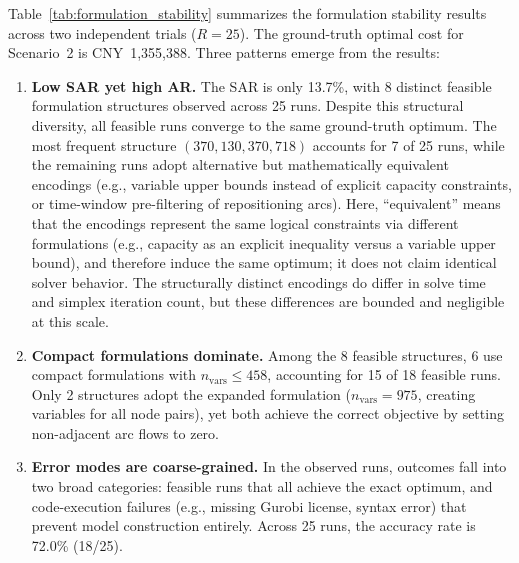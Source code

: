 \documentclass[preprint,12pt]{elsarticle}
\begin{document}
Table~\ref{tab:formulation_stability} summarizes the formulation stability results across two independent trials ($R{=}25$). The ground-truth optimal cost for Scenario~2 is CNY~1,355,388. Three patterns emerge from the results:

\begin{enumerate}
 \item \textbf{Low SAR yet high AR.} The SAR is only 13.7\%, with 8 distinct feasible formulation structures observed across 25 runs. Despite this structural diversity, all feasible runs converge to the same ground-truth optimum. The most frequent structure $(370, 130, 370, 718)$ accounts for 7 of 25 runs, while the remaining runs adopt alternative but mathematically equivalent encodings (e.g., variable upper bounds instead of explicit capacity constraints, or time-window pre-filtering of repositioning arcs). Here, ``equivalent'' means that the encodings represent the same logical constraints via different formulations (e.g., capacity as an explicit inequality versus a variable upper bound), and therefore induce the same optimum; it does not claim identical solver behavior. The structurally distinct encodings do differ in solve time and simplex iteration count, but these differences are bounded and negligible at this scale.

 \item \textbf{Compact formulations dominate.} Among the 8 feasible structures, 6 use compact formulations with $n_{\text{vars}} \leq 458$, accounting for 15 of 18 feasible runs. Only 2 structures adopt the expanded formulation ($n_{\text{vars}} = 975$, creating variables for all node pairs), yet both achieve the correct objective by setting non-adjacent arc flows to zero.

 \item \textbf{Error modes are coarse-grained.} In the observed runs, outcomes fall into two broad categories: feasible runs that all achieve the exact optimum, and code-execution failures (e.g., missing Gurobi license, syntax error) that prevent model construction entirely. Across 25 runs, the accuracy rate is 72.0\% (18/25).
\end{enumerate}
\end{document}
